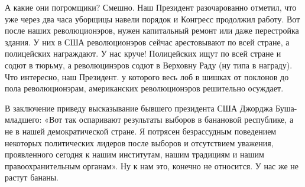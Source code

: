 А какие они погромщики? Смешно. Наш Президент разочарованно отметил, что уже
через два часа уборщицы навели порядок и Конгресс продолжил работу. Вот после
наших революционэров, нужен капитальный ремонт или даже перестройка здания. У
них в США революционэров сейчас арестовывают по всей стране, а полицейских
награждают. У нас круче! Полицейских ищут по всей стране и содют в тюрьму, а
революцинэров содют в Верховну Раду (ну типа в награду). Что интересно, наш
Президент. у которого весь лоб в шишках от поклонов до пола революционэрам,
американских революционэров решительно осуждает.

В заключение приведу высказывание бывшего президента США Джорджа Буша-младшего:
«Вот так оспаривают результаты выборов в банановой республике, а не в нашей
демократической стране. Я потрясен безрассудным поведением некоторых
политических лидеров после выборов и отсутствием уважения, проявленного сегодня
к нашим институтам, нашим традициям и нашим правоохранительным органам». Ну к
нам это, конечно не относится. У нас же не растут бананы.

